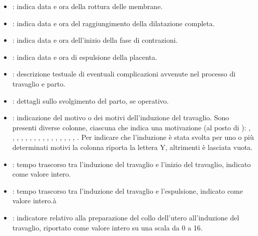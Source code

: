 \begin{itemize}
\item {}: indica data e ora della rottura delle membrane.
\item {}: indica data e ora del raggiungimento della dilatazione completa.
\item {}: indica data e ora dell'inizio della fase di contrazioni.
\item {}: indica data e ora di espulsione della placenta.
\item {}: descrizione testuale di eventuali complicazioni avvenute nel processo di travaglio e parto.
\item {}: dettagli sullo svolgimento del parto, se operativo.
\item {}: indicazione del motivo o dei motivi dell'induzione del travaglio. Sono presenti diverse colonne, ciascuna che indica una motivazione (al posto di ): , , , , , , , , , , , , , , , , . Per indicare che l'induzione è stata svolta per uno o più determinati motivi la colonna riporta la lettera Y, altrimenti è lasciata vuota.
\item {}: tempo trascorso tra l'induzione del travaglio e l'inizio del travaglio, indicato come valore intero.
\item {}: tempo trascorso tra l'induzione del travaglio e l'espulsione, indicato come valore intero.à
\item {}: indicatore relativo alla preparazione del collo dell'utero all'induzione del travaglio, riportato come valore intero su una scala da 0 a 16.
\end{itemize}

